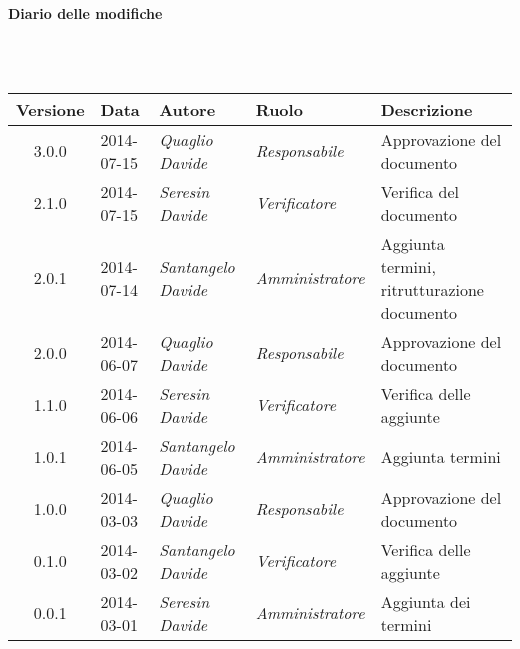 \noindent\begin{Large}\textbf{Diario delle modifiche}\end{Large}\\
\\
\begin{small}
\begin{tabular}{|c|p{1.8cm}|p{2.8cm}|p{2.8cm}|p{3.5cm}|}
\hline
Versione & Data & Autore & Ruolo & Descrizione \\
\hline
\hline
3.0.0 & 2014-07-15 & 
\textit{Quaglio Davide} &
\textit{Responsabile} &  Approvazione del documento\\
\hline
\hline
2.1.0 & 2014-07-15 & 
\textit{Seresin Davide} &
\textit{Verificatore} &  Verifica del documento\\
\hline
\hline
2.0.1 & 2014-07-14 & 
\textit{Santangelo Davide} &
\textit{Amministratore} &  Aggiunta termini, ritrutturazione documento\\
\hline
\hline
2.0.0 & 2014-06-07 & 
\textit{Quaglio Davide} &
\textit{Responsabile} &  Approvazione del documento\\
\hline
\hline
1.1.0 & 2014-06-06 & 
\textit{Seresin Davide} &
\textit{Verificatore} &  Verifica delle aggiunte\\
\hline
\hline
1.0.1 & 2014-06-05 & 
\textit{Santangelo Davide} &
\textit{Amministratore} &  Aggiunta termini\\
\hline
\hline
1.0.0 & 2014-03-03 & 
\textit{Quaglio Davide} &
\textit{Responsabile} &  Approvazione del documento\\
\hline
0.1.0 & 2014-03-02 & 
\textit{Santangelo Davide} &
\textit{Verificatore} &  Verifica delle aggiunte\\
\hline
0.0.1 & 2014-03-01 & 
\textit{Seresin Davide} &
\textit{Amministratore} &  Aggiunta dei termini\\
\hline
\end{tabular}\\
\end{small}